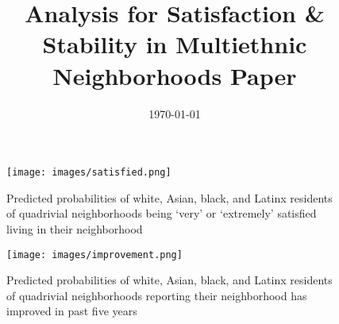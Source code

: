 \documentclass[]{baderart}
\title{Analysis for Satisfaction \& Stability in Multiethnic Neighborhoods Paper}
\date{\today}
\begin{document}
\maketitle









\clearpage

\begin{figure}[h!]
\centering
\caption{Predicted probabilities of white, Asian, black, and Latinx residents of quadrivial neighborhoods being `very' or `extremely' satisfied living in their neighborhood}
\texttt{[image: images/satisfied.png]}
\end{figure}

\begin{figure}[h!]
\centering
\caption{Predicted probabilities of white, Asian, black, and Latinx residents of quadrivial neighborhoods reporting their neighborhood has improved in past five years}
\texttt{[image: images/improvement.png]}
\end{figure}

\clearpage







\end{document}
